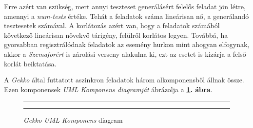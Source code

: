         Erre azért van szükség, mert annyi teszteset generálásért felelős feladat jön létre, \\ amennyi a
        \textit{num-tests} értéke. Tehát a feladatok száma lineárisan nő, a generálandó tesztesetek számával. A
        korlátozás azért van, hogy a feladatok számából következő lineárisan növekvő tárigény, felülről korlátos
        legyen. Továbbá, ha gyorsabban regisztrálódnak feladatok az esemény hurkon mint ahogyan elfogynak, akkor a
        \textit{Szemaforért} is zárolási verseny alakulna ki, ezt az esetet is kizárja a felső korlát beiktatása.

        A \textit{Gekko} által futtatott aszinkron feladatok három alkomponensből állnak össze. Ezen komponensek
        \textit{UML Komponens diagramját} ábrázolja a \textbf{\ref{fig:gekko-uml}. ábra}.

        \begin{figure}[ht]
            \centering
            \hrule
            \hrule
            \caption{\label{fig:gekko-uml} \textit{Gekko UML Komponens} diagram}
        \end{figure}

        \pagebreak

